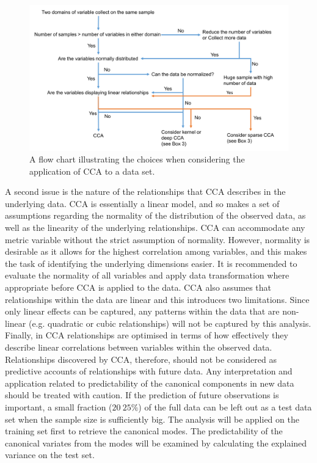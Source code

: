 \begin{figure}[H]
    \centering
    \includegraphics[width=1\textwidth]{cca/image/ccafig4.png}
    \caption{A flow chart illustrating the choices when considering the application of CCA to a data set.}
    \label{fig:methods:fig4}
\end{figure}
A second issue is the nature of the relationships that CCA describes in the underlying data. CCA is essentially a linear model, and so makes a set of assumptions regarding the normality of the distribution of the observed data, as well as the linearity of the underlying relationships. CCA can accommodate any metric variable without the strict assumption of normality. However, normality is desirable as it allows for the highest correlation among variables, and this makes the task of identifying the underlying dimensions easier. It is recommended to evaluate the normality of all variables and apply data transformation where appropriate before CCA is applied to the data. CCA also assumes that relationships within the data are linear and this introduces two limitations. Since only linear effects can be captured, any patterns within the data that are non-linear (e.g. quadratic or cubic relationships) will not be captured by this analysis. Finally, in CCA relationships are optimised in terms of how effectively they describe linear correlations between variables within the observed data. Relationships discovered by CCA, therefore, should not be considered as predictive accounts of relationships with future data. Any interpretation and application related to predictability of the canonical components in new data should be treated with caution. If the prediction of future observations is important, a small fraction ($20~25\%$) of the full data can be left out as a test data set when the sample size is sufficiently big. The analysis will be applied on the training set first to retrieve the canonical modes. The predictability of the canonical variates from the modes will be examined by calculating the explained variance on the test set.  


